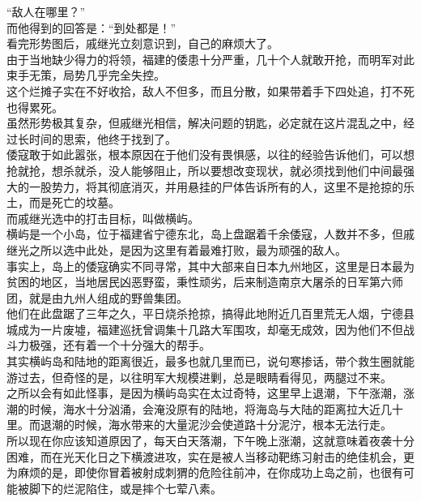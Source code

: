 \begin{multicols}{\theparacolNo}
“敌人在哪里？”\\

而他得到的回答是：“到处都是！”\\

看完形势图后，戚继光立刻意识到，自己的麻烦大了。\\

由于当地缺少得力的将领，福建的倭患十分严重，几十个人就敢开抢，而明军对此束手无策，局势几乎完全失控。\\

这个烂摊子实在不好收拾，敌人不但多，而且分散，如果带着手下四处追，打不死也得累死。\\

虽然形势极其复杂，但戚继光相信，解决问题的钥匙，必定就在这片混乱之中，经过长时间的思索，他终于找到了。\\

倭寇敢于如此嚣张，根本原因在于他们没有畏惧感，以往的经验告诉他们，可以想抢就抢，想杀就杀，没人能够阻止，所以要想改变现状，就必须找到他们中间最强大的一股势力，将其彻底消灭，并用悬挂的尸体告诉所有的人，这里不是抢掠的乐土，而是死亡的坟墓。\\

而戚继光选中的打击目标，叫做横屿。\\

横屿是一个小岛，位于福建省宁德东北，岛上盘踞着千余倭寇，人数并不多，但戚继光之所以选中此处，是因为这里有着最难打败，最为顽强的敌人。\\

事实上，岛上的倭寇确实不同寻常，其中大部来自日本九州地区，这里是日本最为贫困的地区，当地居民凶恶野蛮，秉性顽劣，后来制造南京大屠杀的日军第六师团，就是由九州人组成的野兽集团。\\

他们在此盘踞了三年之久，平日烧杀抢掠，搞得此地附近几百里荒无人烟，宁德县城成为一片废墟，福建巡抚曾调集十几路大军围攻，却毫无成效，因为他们不但战斗力极强，还有着一个十分强大的帮手。\\

其实横屿岛和陆地的距离很近，最多也就几里而已，说句寒掺话，带个救生圈就能游过去，但奇怪的是，以往明军大规模进剿，总是眼睛看得见，两腿过不来。\\

之所以会有如此怪事，是因为横屿岛实在太过奇特，这里早上退潮，下午涨潮，涨潮的时候，海水十分汹涌，会淹没原有的陆地，将海岛与大陆的距离拉大近几十里。而退潮的时候，海水带来的大量泥沙会使道路十分泥泞，根本无法行走。\\

所以现在你应该知道原因了，每天白天落潮，下午晚上涨潮，这就意味着夜袭十分困难，而在光天化日之下横渡进攻，实在是被人当移动靶练习射击的绝佳机会，更为麻烦的是，即使你冒着被射成刺猬的危险往前冲，在你成功上岛之前，也很有可能被脚下的烂泥陷住，或是摔个七荤八素。\\


\end{multicols}
